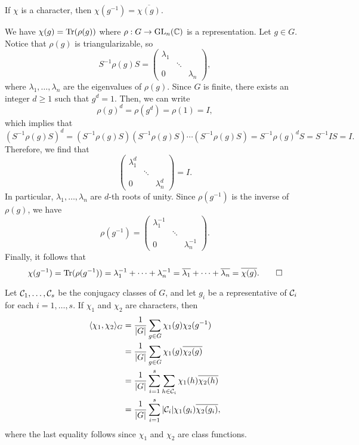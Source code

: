 \begin{remark}{}
    If $\chi$ is a character, then $\chi(g^{-1}) = \overline{\chi(g)}$. 
\end{remark}
\begin{pf}
    We have $\chi(g) = \operatorname{Tr}(\rho(g))$ where $\rho : G \to \operatorname{GL}_n(\mathbb{C})$ is a 
    representation. Let $g \in G$. Notice that $\rho(g)$ is triangularizable, 
    so 
    \[ S^{-1}\rho(g)S = \begin{pmatrix}
        \lambda_1 & &   \\ & \ddots & \\ 0 & & \lambda_n 
    \end{pmatrix}, \] 
    where $\lambda_1, \dots, \lambda_n$ are the eigenvalues of $\rho(g)$. 
    Since $G$ is finite, there exists an integer $d \geq 1$ such that $g^d = 1$. 
    Then, we can write 
    \[ \rho(g)^d = \rho(g^d) = \rho(1) = I, \] 
    which implies that 
    \[ (S^{-1}\rho(g)S)^d = (S^{-1}\rho(g)S)(S^{-1}\rho(g)S)\cdots 
    (S^{-1}\rho(g)S) = S^{-1}\rho(g)^d S = S^{-1}IS = I. \] 
    Therefore, we find that 
    \[ \begin{pmatrix}
        \lambda_1^d & &   \\ & \ddots & \\ 0 & & \lambda_n^d 
    \end{pmatrix} = I. \] 
    In particular, $\lambda_1, \dots, \lambda_n$ are $d$-th roots of unity. 
    Since $\rho(g^{-1})$ is the inverse of $\rho(g)$, we have 
    \[ \rho(g^{-1}) = \begin{pmatrix}
        \lambda_1^{-1} & &   \\ & \ddots & \\ 0 & & \lambda_n^{-1} 
    \end{pmatrix}. \] 
    Finally, it follows that 
    \[ \chi(g^{-1}) = \operatorname{Tr}(\rho(g^{-1})) = \lambda_1^{-1} + \cdots + \lambda_n^{-1}
    = \overline{\lambda_1} + \cdots + \overline{\lambda_n} = \overline{\chi(g)}. 
    \qedhere \] 
\end{pf}

Let ${\cal C}_1, \dots, {\cal C}_s$ be the conjugacy classes of $G$, and let 
$g_i$ be a representative of ${\cal C}_i$ for each $i = 1, \dots, s$. 
If $\chi_1$ and $\chi_2$ are characters, then 
\begin{align*}
    \langle \chi_1, \chi_2 \rangle_G 
    &= \frac1{|G|} \sum_{g\in G} \chi_1(g) \chi_2(g^{-1}) \\ 
    &= \frac1{|G|} \sum_{g\in G} \chi_1(g) \overline{\chi_2(g)} \\ 
    &= \frac1{|G|} \sum_{i=1}^s \sum_{h\in{\cal C}_i} \chi_1(h) \overline{\chi_2(h)} \\
    &= \frac1{|G|} \sum_{i=1}^s |{\cal C}_i| \chi_1(g_i) \overline{\chi_2(g_i)},
\end{align*}
where the last equality follows since $\chi_1$ and $\chi_2$ are class functions. 

